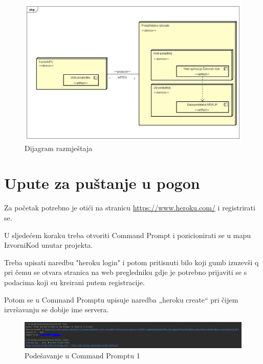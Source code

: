 			\begin{figure}[H]
				\centerfloat
				\includegraphics[scale=0.40]{dijagrami/Dijagramrazmjestaja.jpg} %
				\caption{Dijagram razmještaja}
				
			\end{figure}
			
			\eject
		
		\section{Upute za puštanje u pogon}
		
			\noindent Za početak potrebno je otići na stranicu \url{https://www.heroku.com/} i registrirati se. 
			
			\noindent U sljedećem koraku treba otvoriti Command Prompt i pozicionirati se u mapu IzvorniKod unutar projekta.
			
			\noindent Treba upisati naredbu "heroku login" i potom pritisnuti bilo koji gumb izuzevši q pri čemu se otvara stranica na web pregledniku gdje je potrebno prijaviti se s podacima koji su kreirani putem registracije.
			
			\noindent Potom se u Command Promptu upisuje naredba „heroku create“ pri čijem izvršavanju se dobije ime servera.
			
			\begin{figure}[H]
				\centerfloat
				\includegraphics[scale=0.3]{slike/pustanjeupogon1.jpeg} %
				\caption{Podešavanje u Command Promptu 1}
				
			\end{figure}
			
